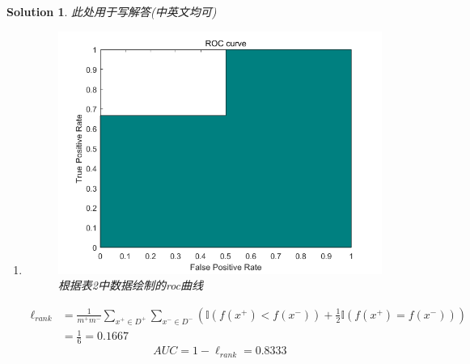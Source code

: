 \documentclass[a4paper,UTF8]{article}
\numberwithin{equation}{section}
\newtheorem*{mySol}{Solution}
\begin{document}
\begin{mySol}
此处用于写解答(中英文均可)\\
\begin{enumerate}
\item 
\begin{figure}[ht]
	\centering
	\includegraphics[scale=0.5]{roc_curve.png}
	\caption{根据表2中数据绘制的roc曲线}
	\label{fig:label}
\end{figure}
\begin{equation}
\begin{aligned}
\ell_{rank} &= \frac{1}{m^+m^-}\sum_{x^+\in D^+}\sum_{x^-\in D^-}\left(\mathbb I\left(f\left(x^+\right)<f\left(x^-\right)\right) + \frac{1}{2}\mathbb{I}\left(f\left(x^+\right)=f\left(x^-\right)\right)\right)\\
 &= \frac{1}{6}=0.1667
\end{aligned}
\end{equation}
\begin{equation}
AUC = 1-\ell_{rank} = 0.8333
\end{equation}


\end{enumerate}
\end{mySol}
\end{document}
